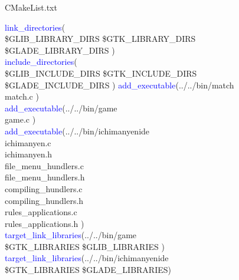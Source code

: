 \documentclass[11pt]{sample}
\begin{document}
\begin{algorithm}
  \caption{CMakeList.txt}
  \begin{algorithmic}
    \STATE\textcolor{Blue}{link\_directories}(\\
  \${GLIB\_LIBRARY\_DIRS} \${GTK\_LIBRARY\_DIRS} \${GLADE\_LIBRARY\_DIRS}
  )\\
   \STATE\textcolor{Blue}{include\_directories}(\\
  \${GLIB\_INCLUDE\_DIRS} \${GTK\_INCLUDE\_DIRS} \${GLADE\_INCLUDE\_DIRS}
  )
  \STATE\textcolor{Blue}{add\_executable}(../../bin/match\\
  match.c
)\\
\STATE\textcolor{Blue}{add\_executable}(../../bin/game\\
  game.c
  )\\
  \STATE\textcolor{Blue}{add\_executable}(../../bin/ichimanyenide\\
  ichimanyen.c \\
  ichimanyen.h\\
  file\_menu\_hundlers.c\\
  file\_menu\_hundlers.h\\
  compiling\_hundlers.c\\
  compiling\_hundlers.h\\
  rules\_applications.c\\
  rules\_applications.h
  )\\
\STATE\textcolor{Blue}{target\_link\_libraries}(../../bin/game \\
    \${GTK\_LIBRARIES} \${GLIB\_LIBRARIES}
    )\\

\STATE\textcolor{Blue}{target\_link\_libraries}(../../bin/ichimanyenide\\
    \${GTK\_LIBRARIES}  \${GLADE\_LIBRARIES})\\

  \end{algorithmic}
\end{algorithm}\\
\end{document}
